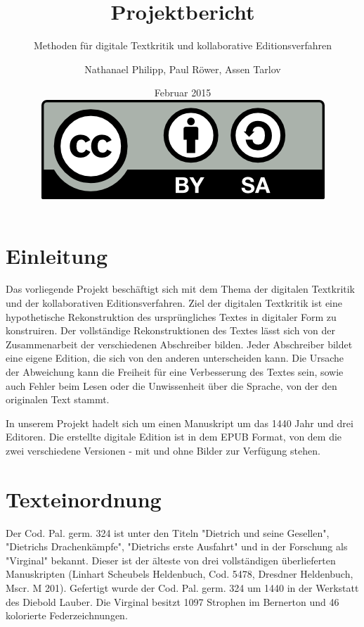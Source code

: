 \documentclass[a4paper, 12pt, oneside]{scrbook}
\author{Nathanael Philipp, Paul Röwer, Assen Tarlov}
\title{Projektbericht}
\subtitle{Methoden für digitale Textkritik und kollaborative Editionsverfahren}
\date{Februar 2015\\\vspace{18em}\includegraphics{by-sa.png}}
\begin{document}
\maketitle\newpage
\tableofcontents\newpage
\chapter{Einleitung}

Das vorliegende Projekt beschäftigt sich mit dem Thema der digitalen Textkritik und der kollaborativen Editionsverfahren. 
Ziel der digitalen Textkritik ist eine hypothetische Rekonstruktion des ursprüngliches Textes in digitaler Form zu konstruiren. Der vollständige Rekonstruktionen des Textes lässt sich von der Zusammenarbeit der verschiedenen Abschreiber bilden. Jeder Abschreiber bildet eine eigene Edition, die sich von den anderen unterscheiden kann. Die Ursache der Abweichung kann die Freiheit für eine Verbesserung des Textes sein, sowie auch Fehler beim Lesen oder die Unwissenheit über die Sprache, von der den originalen Text stammt.  

In unserem Projekt hadelt sich um einen Manuskript um das 1440 Jahr und drei Editoren. Die erstellte digitale Edition ist in dem EPUB Format, von dem die zwei verschiedene Versionen - mit und ohne Bilder zur Verfügung stehen. 


\chapter{Texteinordnung}
Der Cod. Pal. germ. 324 ist unter den Titeln "Dietrich und seine Gesellen", "Dietrichs Drachenkämpfe", "Dietrichs erste Ausfahrt" und in der Forschung als "Virginal" bekannt. Dieser ist der älteste von drei vollständigen überlieferten Manuskripten (Linhart Scheubels Heldenbuch, Cod. 5478, Dresdner Heldenbuch, Mscr. M 201). Gefertigt wurde der Cod. Pal. germ. 324 um 1440 in der Werkstatt des Diebold Lauber. Die Virginal besitzt 1097 Strophen im Bernerton und 46 kolorierte Federzeichnungen.\cite{ubheidelber_bibpal}
\end{document}
